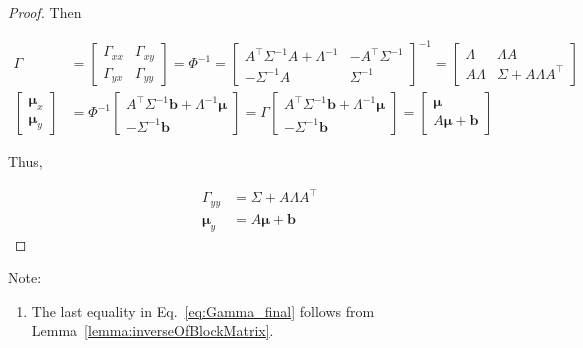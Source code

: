 \begin{proof}
    Then

    \begin{align}
        \Gamma&=\left[\begin{array}{cc}
                         \Gamma_{xx}&\Gamma_{xy}\\
                         \Gamma_{yx}&\Gamma_{yy}
                     \end{array}\right]=
        \Phi^{-1}=\left[\begin{array}{cc}
                                    A^\intercal\Sigma^{-1}A+\Lambda^{-1}&-A^\intercal\Sigma^{-1}\\
                                    -\Sigma^{-1}A&\Sigma^{-1}
                                \end{array}\right]^{-1}
                        =\left[\begin{array}{cc}
                            \Lambda&\Lambda A\\
                                    A\Lambda&\Sigma+A\Lambda A^\intercal
                                \end{array}\right]\label{eq:Gamma_final}\\
        \left[\begin{array}{c}\boldsymbol{\mu}_x\\\boldsymbol{\mu}_y\end{array}\right]&=
            \Phi^{-1}\left[\begin{array}{c}
                      A^\intercal\Sigma^{-1}\mathbf{b}+\Lambda^{-1}\boldsymbol{\mu}\\
                      -\Sigma^{-1}\mathbf{b}
                  \end{array}\right]=
            \Gamma\left[\begin{array}{c}
                      A^\intercal\Sigma^{-1}\mathbf{b}+\Lambda^{-1}\boldsymbol{\mu}\\
                      -\Sigma^{-1}\mathbf{b}
                  \end{array}\right]
                  =\left[\begin{array}{c}
                              \boldsymbol{\mu}\\
                              A\boldsymbol{\mu}+\mathbf{b}
                          \end{array}\right]\nonumber
    \end{align}

    Thus,

    \begin{align*}
        \Gamma_{yy}&=\Sigma+A\Lambda A^\intercal\\
        \boldsymbol{\mu}_y&=A\boldsymbol{\mu}+\mathbf{b}
    \end{align*}

\end{proof}

Note:

\begin{enumerate}
    \item The last equality in Eq.~\ref{eq:Gamma_final} follows from
        Lemma~\ref{lemma:inverseOfBlockMatrix}.
\end{enumerate}
